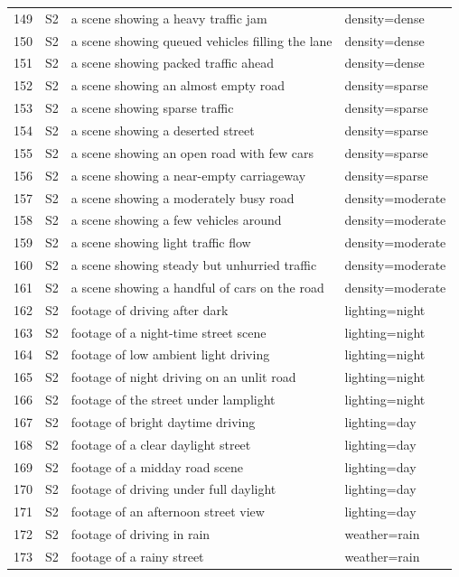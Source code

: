 \begin{longtable}{r l p{8.6cm} p{5.6cm}}
149 & S2 & a scene showing a heavy traffic jam & density=dense\\
150 & S2 & a scene showing queued vehicles filling the lane & density=dense\\
151 & S2 & a scene showing packed traffic ahead & density=dense\\
152 & S2 & a scene showing an almost empty road & density=sparse\\
153 & S2 & a scene showing sparse traffic & density=sparse\\
154 & S2 & a scene showing a deserted street & density=sparse\\
155 & S2 & a scene showing an open road with few cars & density=sparse\\
156 & S2 & a scene showing a near-empty carriageway & density=sparse\\
157 & S2 & a scene showing a moderately busy road & density=moderate\\
158 & S2 & a scene showing a few vehicles around & density=moderate\\
159 & S2 & a scene showing light traffic flow & density=moderate\\
160 & S2 & a scene showing steady but unhurried traffic & density=moderate\\
161 & S2 & a scene showing a handful of cars on the road & density=moderate\\
162 & S2 & footage of driving after dark & lighting=night\\
163 & S2 & footage of a night-time street scene & lighting=night\\
164 & S2 & footage of low ambient light driving & lighting=night\\
165 & S2 & footage of night driving on an unlit road & lighting=night\\
166 & S2 & footage of the street under lamplight & lighting=night\\
167 & S2 & footage of bright daytime driving & lighting=day\\
168 & S2 & footage of a clear daylight street & lighting=day\\
169 & S2 & footage of a midday road scene & lighting=day\\
170 & S2 & footage of driving under full daylight & lighting=day\\
171 & S2 & footage of an afternoon street view & lighting=day\\
172 & S2 & footage of driving in rain & weather=rain\\
173 & S2 & footage of a rainy street & weather=rain\\

\end{longtable}
